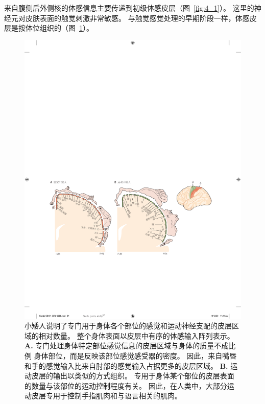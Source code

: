 来自腹侧后外侧核的体感信息主要传递到初级体感皮层（图~\ref{fig:4_1}）。 
这里的神经元对皮肤表面的触觉刺激非常敏感。 
与触觉感觉处理的早期阶段一样，体感皮层是按体位组织的（图~\ref{fig:4_8}）。


\begin{figure}[htbp]
	\centering
	\includegraphics[width=1.0\linewidth]{chap04/fig_4_8}
	\caption{小矮人说明了专门用于身体各个部位的感觉和运动神经支配的皮层区域的相对数量。
		整个身体表面以皮层中有序的体感输入阵列表示。
		\textbf{A.} 专门处理身体特定部位感觉信息的皮层区域与身体的质量不成比例 身体部位，而是反映该部位感觉感受器的密度。
		因此，来自嘴唇和手的感觉输入比来自肘部的感觉输入占据更多的皮层区域。
		\textbf{B.} 运动皮层的输出以类似的方式组织。
		专用于身体某个部位的皮层表面的数量与该部位的运动控制程度有关。
		因此，在人类中，大部分运动皮层专用于控制手指肌肉和与语言相关的肌肉。}
	\label{fig:4_8}
\end{figure}


